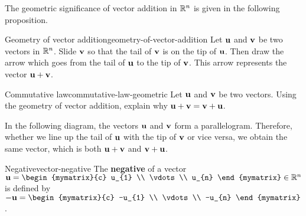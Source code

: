 The geometric significance of vector addition in $\mathbb{R}^n$ is given in
the following proposition.

\begin{proposition}{Geometry of vector addition}{geometry-of-vector-addition}
  Let $\vect{u}$ and $\vect{v}$ be two vectors in $\mathbb{R}^n$. Slide
  $\vect{v}$ so that the tail of $\vect{v}$ is on the tip of
  $\vect{u}$. Then draw the arrow which goes from the tail of
  $\vect{u}$ to the tip of $\vect{v}$.  This arrow represents the
  vector $\vect{u}+\vect{v}$.

  \begin{center}
  \end{center}
\end{proposition}

\begin{example}{Commutative law}{commutative-law-geometric}
  Let $\vect{u}$ and $\vect{v}$ be two vectors. Using the geometry of
  vector addition, explain why $\vect{u}+\vect{v} = \vect{v} + \vect{u}$.
\end{example}

\begin{solution}
  In the following diagram, the vectors $\vect{u}$ and $\vect{v}$ form
  a parallelogram. Therefore, whether we line up the tail of
  $\vect{u}$ with the tip of $\vect{v}$ or vice versa, we obtain the
  same vector, which is both $\vect{u}+\vect{v}$ and
  $\vect{v}+\vect{u}$.
\begin{center}
\end{center}
\end{solution}

\begin{definition}{Negative}{vector-negative}
  The \textbf{negative}%
   of a vector
  $\vect{u}=\begin{mymatrix}{c}
    u_{1} \\
    \vdots \\
    u_{n}
  \end{mymatrix}\in\R^{n}$ is defined by
  $-\vect{u} = \begin{mymatrix}{c}
    -u_{1} \\
    \vdots \\
    -u_{n}
  \end{mymatrix}$.
\end{definition}

